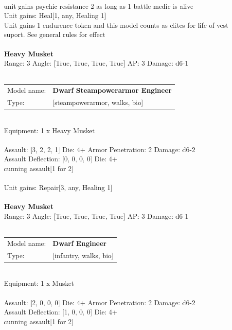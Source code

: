 \ \\
unit gains psychic resistance 2 as long as 1 battle medic is alive\\ 
Unit gains: Heal[1, any, Healing 1]\\ 
Unit gains 1 endurence token and this model counts as elites for life of vest suport. See general rules for effect\\ 

\ \\
{\bf Heavy Musket } \\



Range: 3  Angle: [True, True, True, True] AP: 3 Damage: d6-1 \\




 
\ \\


\begin{tabular}{ll}
Model name: & {\bf Dwarf Steampowerarmor Engineer } \\
Type: & [steampowerarmor, walks, bio] \\
\end{tabular}
\ \\
Equipment: 1 x Heavy Musket \\
\ \\
Assault: [3, 2, 2, 1] Die: 4+ Armor Penetration: 2 Damage: d6-2 \\
Assault Deflection: [0, 0, 0, 0] Die: 4+\\
\indent cunning assault[1 for 2]\\ 
 
\ \\
Unit gains: Repair[3, any, Healing 1]\\ 

\ \\
{\bf Heavy Musket } \\



Range: 3  Angle: [True, True, True, True] AP: 3 Damage: d6-1 \\




 
\ \\


\begin{tabular}{ll}
Model name: & {\bf Dwarf Engineer } \\
Type: & [infantry, walks, bio] \\
\end{tabular}
\ \\
Equipment: 1 x Musket \\
\ \\
Assault: [2, 0, 0, 0] Die: 4+ Armor Penetration: 2 Damage: d6-2 \\
Assault Deflection: [1, 0, 0, 0] Die: 4+\\
\indent cunning assault[1 for 2]\\ 
 
